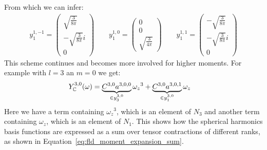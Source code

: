 From which we can infer:
\begin{align}
y^{1,-1}_1 = \begin{pmatrix}\sqrt{\frac{3}{8\pi}}  \\ -\sqrt{\frac{3}{8\pi}}i \\ 0 \end{pmatrix}
\qquad
y^{1,0}_1 = \begin{pmatrix}0  \\ 0 \\ \sqrt{\frac{3}{4\pi}} \end{pmatrix}
\qquad
y^{1,1}_1 = \begin{pmatrix}-\sqrt{\frac{3}{8\pi}}  \\ -\sqrt{\frac{3}{8\pi}}i \\ 0 \end{pmatrix}
\end{align}
This scheme continues and becomes more involved for higher moments. For example with $l=3$ an $m=0$ we get:
\begin{align}
Y_{\mathbb{C}}^{3,0}(\omega) &= \underbrace{C^{{3,0}}a^{{3,0,0}}}_{\in y^{3,0}_3}{\omega_z}^{3}+\underbrace{C^{{3,0}}a^{{3,0,1}}}_{\in y^{3,0}_1}\omega_z
\end{align}
Here we have a term containing ${\omega_z}^{3}$, which is an element of $N_3$ and another term containing $\omega_z$, which is an element of $N_1$. This shows how the spherical harmonics basis functions are expressed as a sum over tensor contractions of different ranks, as shown in Equation~\ref{eq:fld_moment_expansion_sum}.

